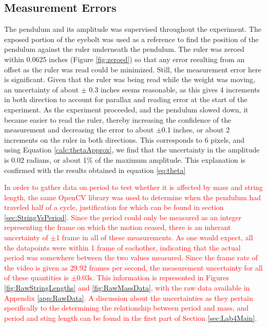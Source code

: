 \documentclass[11pt]{article}
\begin{document}
        \subsection{Measurement Errors}\label{SourcesOfError:MeasurementErrors}
        The pendulum and its amplitude was supervised throughout the experiment. The exposed portion of the eyebolt was used as a reference to find the position of the pendulum against the ruler underneath the pendulum. The ruler was zeroed within 0.0625 inches (Figure \ref{fig:zeroed}) so that any error resulting from an offset as the ruler was read could be minimized. Still, the measurement error here is significant. Given that the ruler was being read while the weight was moving, an uncertainty of about $\pm$ 0.3 inches seems reasonable, as this gives 4 increments in both direction to account for parallax and reading error at the start of the experiment. As the experiment proceeded, and the pendulum slowed down, it became easier to read the ruler, thereby increasing the confidence of the measurement and decreasing the error to about $\pm$0.1 inches, or about 2 increments on the ruler in both directions. This corresponds to 6 pixels, and using Equation \ref{calc:thetaApprox}, we find that the uncertainty in the amplitude is 0.02 radians, or about 1\% of the maximum amplitude. This explanation is confirmed with the results obtained in equation \ref{eq:theta}
        
        \textcolor{red}{In order to gather data on period to test whether it is affected by mass and string length, the same OpenCV library was used to determine when the pendulum had traveled half of a cycle, justification for which can be found in section \ref{sec:StringVsPeriod}. Since the period could only be measured as an integer representing the frame on which the motion ceased, there is an inherant uncertainty of $\pm$1 frame in all of these measurements. As one would expect, all the datapoints were within 1 frame of eachother, indicating that the actual period was somewhere between the two values measured. Since the frame rate of the video is given as 29.92 frames per second, the measurement uncertainty for all of these quantities is $\pm$0.03s. This information is represented in Figures \ref{fig:RawStringLengths} and \ref{fig:RawMassData}, with the raw data available in Appendix \ref{app:RawData}. A discussion about the uncertainties as they pertain specifically to the determining the relationship between period and mass, and period and sting length can be found in the first part of Section \ref{sec:Lab4Main}.}
\end{document}
